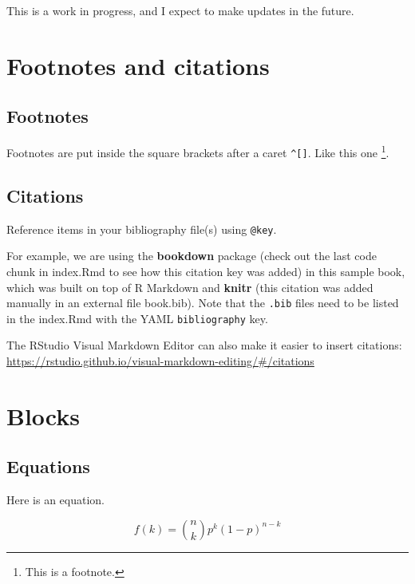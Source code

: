 \documentclass[
]{book}
\theoremstyle{definition}
\theoremstyle{definition}
\theoremstyle{definition}
\theoremstyle{definition}
\theoremstyle{remark}
\begin{document}
This is a work in progress, and I expect to make updates in the future.

\hypertarget{footnotes-and-citations}{%
\chapter{Footnotes and citations}\label{footnotes-and-citations}}

\hypertarget{footnotes}{%
\section{Footnotes}\label{footnotes}}

Footnotes are put inside the square brackets after a caret \texttt{\^{}{[}{]}}. Like this one \footnote{This is a footnote.}.

\hypertarget{citations}{%
\section{Citations}\label{citations}}

Reference items in your bibliography file(s) using \texttt{@key}.

For example, we are using the \textbf{bookdown} package \citep{R-bookdown} (check out the last code chunk in index.Rmd to see how this citation key was added) in this sample book, which was built on top of R Markdown and \textbf{knitr} \citep{xie2015} (this citation was added manually in an external file book.bib).
Note that the \texttt{.bib} files need to be listed in the index.Rmd with the YAML \texttt{bibliography} key.

The RStudio Visual Markdown Editor can also make it easier to insert citations: \url{https://rstudio.github.io/visual-markdown-editing/\#/citations}

\hypertarget{blocks}{%
\chapter{Blocks}\label{blocks}}

\hypertarget{equations}{%
\section{Equations}\label{equations}}

Here is an equation.

\begin{equation} 
  f\left(k\right) = \binom{n}{k} p^k\left(1-p\right)^{n-k}
  \label{eq:binom}
\end{equation}
\end{document}
